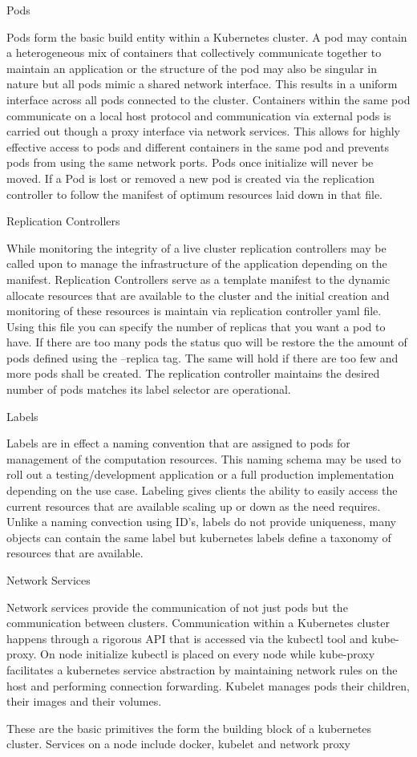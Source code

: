 \documentclass{article}
\begin{document}
Pods
\par
Pods form the basic build entity within a Kubernetes cluster. A pod may contain a heterogeneous mix of containers that collectively communicate together to maintain an application or the structure of the pod may also be singular in nature but all pods mimic a shared network interface. This results in a uniform interface across all pods connected to the cluster. Containers within the same pod communicate on a local host protocol and communication via external pods is carried out though a proxy interface via network services. This allows for highly effective access to pods and different containers in the same pod and prevents pods from using the same network ports. Pods once initialize will never be moved. If a Pod is lost or removed a new pod is created via the replication controller to follow the manifest of optimum resources laid down in that file.

Replication Controllers
\par
While monitoring the integrity of a live cluster replication controllers may be called upon to manage the infrastructure of the application depending on the manifest. Replication Controllers serve as a template manifest to the dynamic allocate resources that are available to the cluster and the initial creation and monitoring of these resources is maintain via replication controller yaml file.  Using this file you can specify the number of replicas that you want a pod to have. If there are too many pods the status quo will be restore the the amount of pods defined using the –replica tag. The same will hold if there are too few and more pods shall be created.  The replication controller maintains the desired number of pods matches its label selector are operational.


Labels
\par
Labels are in effect a naming convention that are assigned to pods for management of the computation resources. This naming schema may be used to roll out a testing/development application or a full production implementation depending on the use case. Labeling gives clients the ability to easily access the current resources that are available scaling up or down as the need requires.
Unlike a naming convection using ID’s, labels do not provide uniqueness, many objects can contain the same label but kubernetes labels define a taxonomy of resources that are available.


Network Services
\par
Network services provide the communication of not just pods but the communication between clusters. Communication within a Kubernetes cluster happens through a rigorous API that is accessed via the kubectl tool and kube-proxy. On node initialize kubectl is placed on every node while kube-proxy facilitates a kubernetes service abstraction by maintaining network rules on the host and performing connection forwarding. Kubelet manages pods their children, their images and their volumes.
\par
These are the basic primitives the form the building block of a kubernetes cluster. Services on a node include docker, kubelet and network proxy
\end{document}
